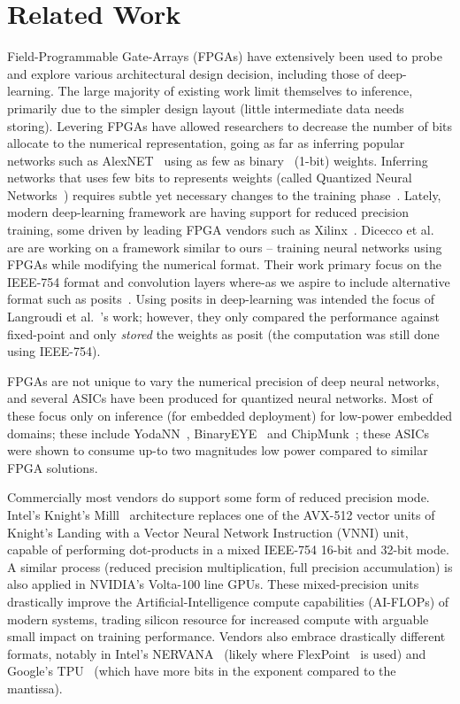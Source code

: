 \documentclass[techrep,english]{ipsj} %
\begin{document}
\section{Related Work}\label{sec:relwork}
Field-Programmable Gate-Arrays (FPGAs) have extensively been used to probe and explore various architectural design decision, including those of deep-learning.
The large majority of existing work limit themselves to inference, primarily due to the simpler design layout (little intermediate data needs storing).
Levering FPGAs have allowed researchers to decrease the number of bits allocate to the numerical representation, going as far as inferring popular networks such as  AlexNET~\cite{krizhevsky2012imagenet} using as few as binary~\cite{shimoda2017all,umuroglu2017finn} (1-bit) weights.
Inferring networks that uses few bits to represents weights (called Quantized Neural Networks~\cite{courbariaux2016binarized}) requires subtle yet necessary changes to the training phase~\cite{binaryconnect,courbariaux2016binarized,zhou2016dorefa}.
Lately, modern deep-learning framework are having support for reduced precision training, some driven by leading FPGA vendors such as Xilinx~\cite{xilinxml}.
Dicecco et al.~\cite{dicecco2017fpga} are are working on a framework similar to ours – training neural networks using FPGAs while modifying the numerical format.
Their work primary focus on the IEEE-754 format and convolution layers where-as we aspire to include alternative format such as posits~\cite{posits}.
Using posits in deep-learning was intended the focus of Langroudi et al.~\cite{langroudi2018deep}’s work; however, they only compared the performance against fixed-point and only \textit{stored} the weights as posit (the computation was still done using IEEE-754).

FPGAs are not unique to vary the numerical precision of deep neural networks, and several ASICs have been produced for quantized neural networks.
Most of these focus only on inference (for embedded deployment)  for low-power embedded domains; these include YodaNN~\cite{yodann}, BinaryEYE~\cite{binaryeye} and ChipMunk~\cite{chipmunk}; these ASICs were shown to consume up-to two magnitudes low power compared to similar FPGA solutions.

Commercially most vendors do support some form of reduced precision mode.
Intel’s Knight’s Milll~\cite{knm} architecture replaces one of the AVX-512 vector units of Knight’s Landing with a Vector Neural Network Instruction (VNNI) unit, capable of performing dot-products in a mixed IEEE-754 16-bit and 32-bit mode.
A similar process (reduced precision multiplication, full precision accumulation) is also applied in NVIDIA’s Volta-100 line GPUs.
These mixed-precision units drastically improve the Artificial-Intelligence compute capabilities (AI-FLOPs) of modern systems, trading silicon resource for increased compute with arguable small impact on training performance.
Vendors also embrace drastically different formats, notably in Intel’s NERVANA~\cite{nervana} (likely where FlexPoint~\cite{intelflexpoint} is used) and Google’s TPU~\cite{tpuformat} (which have more bits in the exponent compared to the mantissa).
\end{document}
